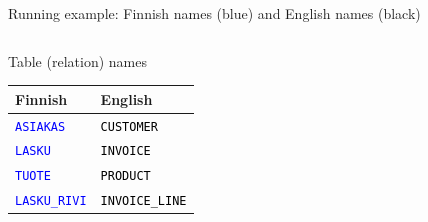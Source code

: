 \documentclass[10pt,aspectratio=169]{beamer}
\newcommand{\fin}[1]{\textcolor{blue}{\texttt{#1}}}
\newcommand{\eng}[1]{\textcolor{black}{\texttt{#1}}}
\begin{document}
\begin{frame}{Running example: Finnish names (blue) and English names (black)}
\begin{columns}[T,onlytextwidth]

\begin{block}{Table (relation) names}
\footnotesize
\begin{tabular}{@{}ll@{}}
\toprule
\textbf{Finnish} & \textbf{English}\\
\midrule
\fin{ASIAKAS} & \eng{CUSTOMER}\\
\fin{LASKU} & \eng{INVOICE}\\
\fin{TUOTE} & \eng{PRODUCT}\\
\fin{LASKU\_RIVI} & \eng{INVOICE\_LINE}\\
\bottomrule
\end{tabular}
\end{block}

\end{columns}
\end{frame}





\end{document}
